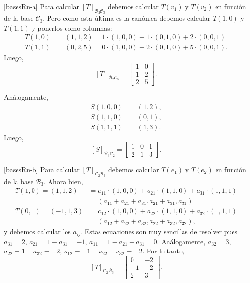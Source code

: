 \begin{enumerate}[topsep=6pt, itemsep=.4cm]
\rta

\ref{basesRn-a} Para calcular $[T]_{\mathcal{B}_2\mathcal{C}_3}$ debemos calcular $T(v_1)$ y $T(v_2)$ en función de la base $\mathcal{C}_3$. Pero como esta última es la canónica debemos calcular $T(1,0)$ y $T(1,1)$ y ponerlos como columnas:
\begin{align*}
    T(1,0) &= (1,1,2) = 1 \cdot (1,0,0) + 1 \cdot (0,1,0) + 2 \cdot (0,0,1) \\
    T(1,1) &= (0,2,5) = 0 \cdot (1,0,0) + 2 \cdot (0,1,0) + 5 \cdot (0,0,1).
\end{align*}
Luego,
$$
[T]_{\mathcal{B}_2\mathcal{C}_3} = \begin{bmatrix}
    1 & 0 \\ 1 & 2 \\ 2 & 5 
\end{bmatrix}.
$$


Análogamente,
\begin{align*}
    S(1,0,0) &= (1,2), \\ S(1,1,0) &= (0,1), \\  S(1,1,1) &= (1,3).
\end{align*}
Luego, 
$$
[S]_{\mathcal{B}_3\mathcal{C}_2} = \begin{bmatrix}
    1 & 0 & 1 \\ 2 & 1 & 3
\end{bmatrix}.
$$

\ref{basesRn-b} Para calcular $[T]_{\mathcal{C}_2\mathcal{B}_3}$ debemos calcular $T(e_1)$ y $T(e_2)$ en función de la base $\mathcal{B}_3$. Ahora bien,
\begin{align*}
    T(1,0) = (1,1,2) &= a_{11} \cdot (1,0,0) + a_{21} \cdot (1,1,0) + a_{31} \cdot (1,1,1) \\
    &=(a_{11} + a_{21} + a_{31}, a_{21} + a_{31}, a_{31}) \\
    T(0,1) = (-1,1,3) &= a_{12} \cdot (1,0,0) + a_{22} \cdot (1,1,0) + a_{32} \cdot (1,1,1)\\
    &=(a_{12} + a_{22} + a_{32}, a_{22} + a_{32}, a_{32}),
\end{align*}
y debemos calcular los $a_{ij}$. Estas ecuaciones son muy sencillas de resolver pues $a_{31} = 2$, $a_{21} = 1 -a_{31} = -1$, $a_{11} = 1 - a_{21} - a_{31} = 0$. Análogamente, $a_{32} = 3$, $a_{22} = 1 - a_{32} = -2$, $a_{12} = -1 - a_{22} - a_{32} = -2$. Por lo tanto,
$$
[T]_{\mathcal{C}_2\mathcal{B}_3} = \begin{bmatrix}
    0 & -2  \\ -1 & -2 \\ 2 & 3
\end{bmatrix}.
$$ 


\end{enumerate}
